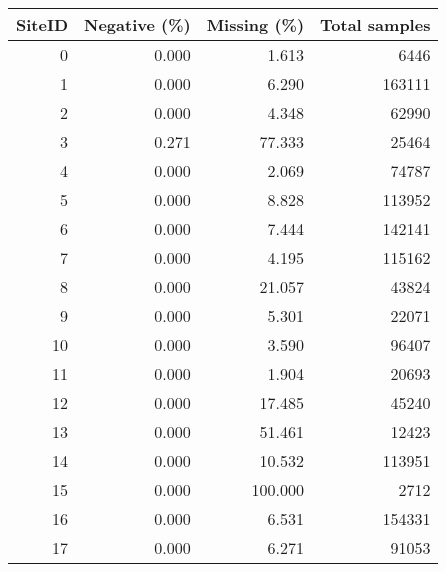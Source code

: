 \begin{tabular}{rrrr}
\toprule
 SiteID &  Negative (\%) &  Missing (\%) &  Total samples \\
\midrule
      0 &         0.000 &        1.613 &           6446 \\
      1 &         0.000 &        6.290 &         163111 \\
      2 &         0.000 &        4.348 &          62990 \\
      3 &         0.271 &       77.333 &          25464 \\
      4 &         0.000 &        2.069 &          74787 \\
      5 &         0.000 &        8.828 &         113952 \\
      6 &         0.000 &        7.444 &         142141 \\
      7 &         0.000 &        4.195 &         115162 \\
      8 &         0.000 &       21.057 &          43824 \\
      9 &         0.000 &        5.301 &          22071 \\
     10 &         0.000 &        3.590 &          96407 \\
     11 &         0.000 &        1.904 &          20693 \\
     12 &         0.000 &       17.485 &          45240 \\
     13 &         0.000 &       51.461 &          12423 \\
     14 &         0.000 &       10.532 &         113951 \\
     15 &         0.000 &      100.000 &           2712 \\
     16 &         0.000 &        6.531 &         154331 \\
     17 &         0.000 &        6.271 &          91053 \\
\bottomrule
\end{tabular}
